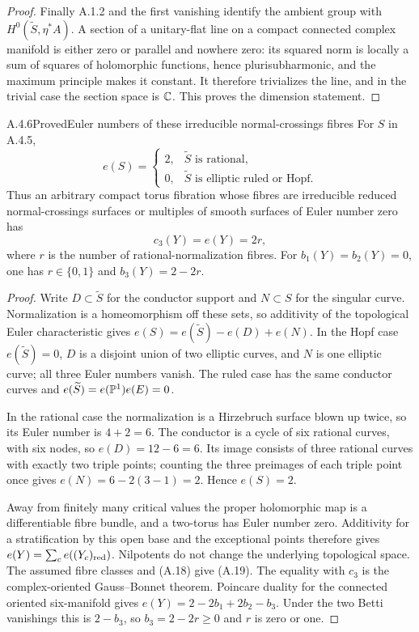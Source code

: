 \begin{proof}
Finally A.1.2 and the first vanishing identify the ambient group with $H^0(\widetilde S,\eta^*A)$. A section of a unitary-flat line on a compact connected complex manifold is either zero or parallel and nowhere zero: its squared norm is locally a sum of squares of holomorphic functions, hence plurisubharmonic, and the maximum principle makes it constant. It therefore trivializes the line, and in the trivial case the section space is $\mathbb C$. This proves the dimension statement.
\end{proof}



\begin{statement}{A.4.6}{Proved}{Euler numbers of these irreducible normal-crossings fibres}
For $S$ in A.4.5,
\[
e(S)=\begin{cases}
2,&\widetilde S\text{ is rational},\\
0,&\widetilde S\text{ is elliptic ruled or Hopf}.
\end{cases}
\tag{A.18}
\]
Thus an arbitrary compact torus fibration whose fibres are irreducible reduced normal-crossings surfaces or multiples of smooth surfaces of Euler number zero has
\[
c_3(Y)=e(Y)=2r,
\tag{A.19}
\]
where $r$ is the number of rational-normalization fibres. For $b_1(Y)=b_2(Y)=0$, one has $r\in\{0,1\}$ and $b_3(Y)=2-2r$.
\end{statement}
\begin{proof}
Write $D\subset\widetilde S$ for the conductor support and $N\subset S$ for the singular curve. Normalization is a homeomorphism off these sets, so additivity of the topological Euler characteristic gives $e(S)=e(\widetilde S)-e(D)+e(N)$. In the Hopf case $e(\widetilde S)=0$, $D$ is a disjoint union of two elliptic curves, and $N$ is one elliptic curve; all three Euler numbers vanish. The ruled case has the same conductor curves and $e(\widetilde S)=e(\mathbb P^1)e(E)=0$.

In the rational case the normalization is a Hirzebruch surface blown up twice, so its Euler number is $4+2=6$. The conductor is a cycle of six rational curves, with six nodes, so $e(D)=12-6=6$. Its image consists of three rational curves with exactly two triple points; counting the three preimages of each triple point once gives $e(N)=6-2(3-1)=2$. Hence $e(S)=2$.

Away from finitely many critical values the proper holomorphic map is a differentiable fibre bundle, and a two-torus has Euler number zero. Additivity for a stratification by this open base and the exceptional points therefore gives $e(Y)=\sum_c e((Y_c)_{\rm red})$. Nilpotents do not change the underlying topological space. The assumed fibre classes and (A.18) give (A.19). The equality with $c_3$ is the complex-oriented Gauss--Bonnet theorem. Poincare duality for the connected oriented six-manifold gives $e(Y)=2-2b_1+2b_2-b_3$. Under the two Betti vanishings this is $2-b_3$, so $b_3=2-2r\ge0$ and $r$ is zero or one.
\end{proof}


